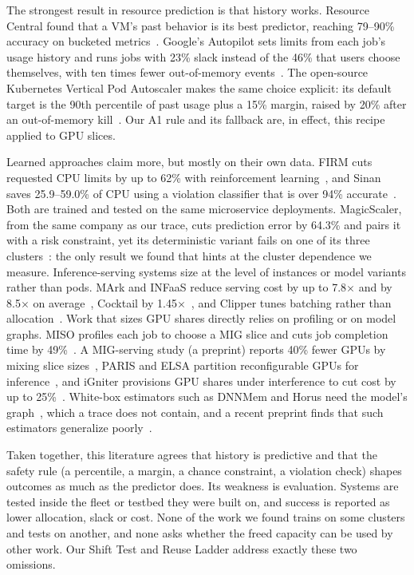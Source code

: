 \documentclass[10pt]{article}
\begin{document}
The strongest result in resource prediction is that history works. Resource Central found that a VM's past behavior is its best predictor, reaching 79--90\% accuracy on bucketed metrics~\citep{cortez2017resource}. Google's Autopilot sets limits from each job's usage history and runs jobs with 23\% slack instead of the 46\% that users choose themselves, with ten times fewer out-of-memory events~\citep{rzadca2020autopilot}. The open-source Kubernetes Vertical Pod Autoscaler makes the same choice explicit: its default target is the 90th percentile of past usage plus a 15\% margin, raised by 20\% after an out-of-memory kill~\citep{k8svpa}. Our A1 rule and its fallback are, in effect, this recipe applied to GPU slices.

Learned approaches claim more, but mostly on their own data. FIRM cuts requested CPU limits by up to 62\% with reinforcement learning~\citep{qiu2020firm}, and Sinan saves 25.9--59.0\% of CPU using a violation classifier that is over 94\% accurate~\citep{zhang2021sinan}. Both are trained and tested on the same microservice deployments. MagicScaler, from the same company as our trace, cuts prediction error by 64.3\% and pairs it with a risk constraint, yet its deterministic variant fails on one of its three clusters~\citep{pan2023magicscaler}: the only result we found that hints at the cluster dependence we measure. Inference-serving systems size at the level of instances or model variants rather than pods. MArk and INFaaS reduce serving cost by up to 7.8$\times$ and by 8.5$\times$ on average~\citep{zhang2019mark,romero2021infaas}, Cocktail by 1.45$\times$~\citep{gunasekaran2022cocktail}, and Clipper tunes batching rather than allocation~\citep{crankshaw2017clipper}. Work that sizes GPU shares directly relies on profiling or on model graphs. MISO profiles each job to choose a MIG slice and cuts job completion time by 49\%~\citep{li2022miso}. A MIG-serving study (a preprint) reports 40\% fewer GPUs by mixing slice sizes~\citep{tan2021migserving}, PARIS and ELSA partition reconfigurable GPUs for inference~\citep{kim2022paris}, and iGniter provisions GPU shares under interference to cut cost by up to 25\%~\citep{xu2022igniter}. White-box estimators such as DNNMem and Horus need the model's graph~\citep{gao2020dnnmem,yeung2022horus}, which a trace does not contain, and a recent preprint finds that such estimators generalize poorly~\citep{yousefzadeh2026gpuestimation}.

Taken together, this literature agrees that history is predictive and that the safety rule (a percentile, a margin, a chance constraint, a violation check) shapes outcomes as much as the predictor does. Its weakness is evaluation. Systems are tested inside the fleet or testbed they were built on, and success is reported as lower allocation, slack or cost. None of the work we found trains on some clusters and tests on another, and none asks whether the freed capacity can be used by other work. Our Shift Test and Reuse Ladder address exactly these two omissions.
\end{document}
